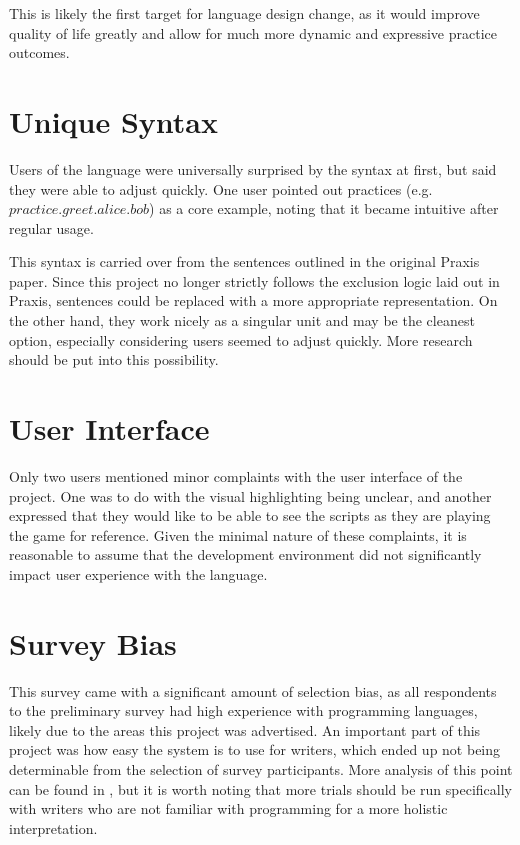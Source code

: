 This is likely the first target for language design change, as it would improve quality
of life greatly and allow for much more dynamic and expressive practice outcomes.

\section{Unique Syntax} \label{sec:UniqueSyntax}

Users of the language were universally surprised by the syntax at first, but said they
were able to adjust quickly. One user pointed out practices (e.g. $practice.greet.alice.bob$)
as a core example, noting that it became intuitive after regular usage.

This syntax is carried over from the sentences outlined in the original Praxis paper. \cite{evans_ai_2015}
Since this project no longer strictly follows the exclusion logic laid out in
Praxis, sentences could be replaced with a more appropriate representation. On the other
hand, they work nicely as a singular unit and may be the cleanest option, especially
considering users seemed to adjust quickly. More research should be put into this
possibility.

\section{User Interface} \label{sec:UserInterface}

Only two users mentioned minor complaints with the user interface of the project.
One was to do with the visual highlighting being unclear, and another expressed that
they would like to be able to see the scripts as they are playing the game for
reference. Given the minimal nature of these complaints, it is reasonable to assume
that the development environment did not significantly impact user experience with the language.

\section{Survey Bias} \label{sec:SurveyBias}

This survey came with a significant amount of selection bias, as all respondents
to the preliminary survey had high experience with programming languages,
likely due to the areas this project was advertised. An important part of
this project was how easy the system is to use for writers, which ended up not
being determinable from the selection of survey participants. More analysis of
this point can be found in , but it is worth noting
that more trials should be run specifically with writers who are not familiar
with programming for a more holistic interpretation.

